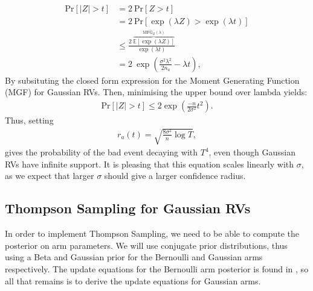 \documentclass[a4paper]{article}
\begin{document}
	\begin{align}
	\text{Pr}[|Z| > t] &= 2\ \text{Pr}[Z > t] \tag*{(Symmetry)} \\
	&= 2\ \text{Pr}[\exp(\lambda Z) > \exp(\lambda t)] \tag*{(For $\lambda > 0$)} \\
	&\leq \frac{2\  \overbrace{\mathbb{E}[\exp(\lambda Z)]}^{\text{MFG}_Z(\lambda)}}{\exp(\lambda t)} \tag*{(Markov's Inequality)} \\
	&= 2\ \exp(\frac{\sigma^2 \lambda^2}{2 n_a} - \lambda t),
	\end{align}
	By subsituting the closed form expression for the Moment Generating Function (MGF) for Gaussian RVs. Then, minimising the upper bound over lambda yields:
	\begin{align}
	\text{Pr}[|Z| > t] \leq 2 \exp(\frac{-n}{2\sigma^2} t^2).
	\end{align}
	Thus, setting
	\begin{align}
	r_a(t) = \sqrt{\frac{8 \sigma^2}{n} \log T}, \label{gaussian_rad}
	\end{align}
	gives the probability of the bad event decaying with $T^4$, even though Gaussian RVs have infinite support. It is pleasing that this equation scales linearly with $\sigma$, as we expect that larger $\sigma$ should give a larger confidence radius. 
	
	\subsection{Thompson Sampling for Gaussian RVs}
	In order to implement Thompson Sampling, we need to be able to compute the posterior on arm parameters. We will use conjugate prior distributions, thus using a Beta and Gaussian prior for the Bernoulli and Gaussian arms respectively. The update equations for the Bernoulli arm posterior is found in \cite{thompson}, so all that remains is to derive the update equations for Gaussian arms.
	
\end{document}
